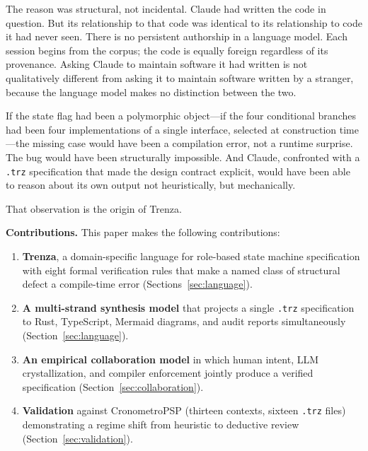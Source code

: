 The reason was structural, not incidental. Claude had written the code in
question. But its relationship to that code was identical to its relationship
to code it had never seen. There is no persistent authorship in a language
model. Each session begins from the corpus; the code is equally foreign
regardless of its provenance. Asking Claude to maintain software it had written
is not qualitatively different from asking it to maintain software written by a
stranger, because the language model makes no distinction between the two.

If the state flag had been a polymorphic object---if the four conditional
branches had been four implementations of a single interface, selected at
construction time---the missing case would have been a compilation error, not a
runtime surprise. The bug would have been structurally impossible. And Claude,
confronted with a \texttt{.trz} specification that made the design contract
explicit, would have been able to reason about its own output not
heuristically, but mechanically.

That observation is the origin of Trenza.

\medskip

\noindent\textbf{Contributions.}
This paper makes the following contributions:
\begin{enumerate}
  \item \textbf{Trenza}, a domain-specific language for role-based state machine
        specification with eight formal verification rules that make a named
        class of structural defect a compile-time error
        (Sections~\ref{sec:language}).
  \item \textbf{A multi-strand synthesis model} that projects a single
        \texttt{.trz} specification to Rust, TypeScript, Mermaid diagrams, and
        audit reports simultaneously
        (Section~\ref{sec:language}).
  \item \textbf{An empirical collaboration model} in which human intent,
        LLM crystallization, and compiler enforcement jointly produce a
        verified specification (Section~\ref{sec:collaboration}).
  \item \textbf{Validation} against CronometroPSP (thirteen contexts,
        sixteen \texttt{.trz} files) demonstrating a regime shift from
        heuristic to deductive review (Section~\ref{sec:validation}).
\end{enumerate}
